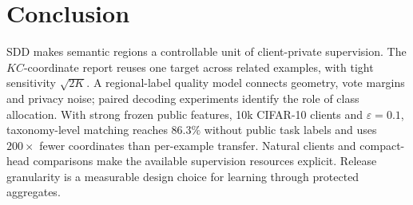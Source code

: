 \section{Conclusion}
\label{sec:conclusion}

SDD makes semantic regions a controllable unit of client-private supervision.
The $KC$-coordinate report reuses one target across related examples, with
tight sensitivity $\sqrt{2K}$. A regional-label quality model connects geometry,
vote margins and privacy noise; paired decoding experiments identify the role
of class allocation. With strong frozen public features, 10k CIFAR-10 clients
and $\varepsilon=0.1$, taxonomy-level matching reaches $86.3\%$ without public
task labels and uses $200\times$ fewer coordinates than per-example transfer.
Natural clients and compact-head comparisons make the available supervision
resources explicit. Release granularity is a measurable design choice for
learning through protected aggregates.
